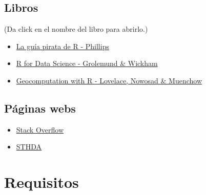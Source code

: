 \documentclass[]{article}
\providecommand{\tightlist}{%
  \setlength{\itemsep}{0pt}\setlength{\parskip}{0pt}}
\begin{document}
\subsection{Libros}\label{libros}

(Da click en el nombre del libro para abrirlo.)

\begin{itemize}
\tightlist
\item
  \href{https://bookdown.org/ndphillips/YaRrr/}{La guía pirata de R -
  Phillips}
\item
  \href{http://r4ds.had.co.nz/}{R for Data Science - Grolemund \&
  Wickham}
\item
  \href{https://geocompr.robinlovelace.net/}{Geocomputation with R -
  Lovelace, Nowosad \& Muenchow}
\end{itemize}

\subsection{Páginas webs}\label{paginas-webs}

\begin{itemize}
\tightlist
\item
  \href{https://stackoverflow.com/}{Stack Overflow}
\item
  \href{http://www.sthda.com/english/}{STHDA}
\end{itemize}

\section{Requisitos}\label{requisitos}
\end{document}
